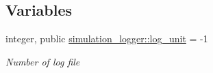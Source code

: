 \subsection*{Variables}
\begin{DoxyCompactItemize}
\item 
integer, public \hyperlink{namespacesimulation__logger_a9ef3d703b0c79dd563330003a82c99d9}{simulation\+\_\+logger\+::log\+\_\+unit} = -\/1
\begin{DoxyCompactList}\small\item\em \textquotesingle{}Number\textquotesingle{} of log file \end{DoxyCompactList}\end{DoxyCompactItemize}

